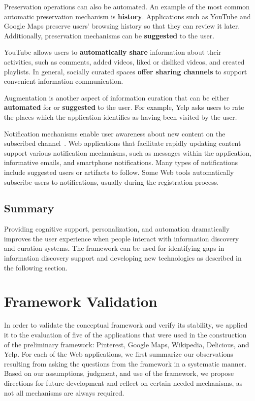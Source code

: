 \documentclass{sigchi}
\begin{document}
{{{{Preservation operations can also be automated. An example of the most common automatic preservation mechanism is \textbf{history}. Applications such as YouTube and Google Maps preserve users' browsing history so that they can review it later. Additionally, preservation mechanisms can be \textbf{suggested} to the user.


YouTube allows users to \textbf{automatically share} information about their activities, such as comments,  added videos, liked or disliked videos, and created playlists. In general, socially curated spaces \textbf{offer sharing channels} to support convenient information communication.
 
Augmentation is another aspect of information curation that can be either \textbf{automated} for or \textbf{suggested} to the user. For example, Yelp asks users to rate the places which the application identifies as having been visited by the user. 


Notification mechanisms enable user awareness about new content on the subscribed channel~\cite{millen2005social}. Web applications that facilitate rapidly updating content support various notification mechanisms, such as messages within the application, informative emails, and smartphone notifications. Many types of notifications include suggested users or artifacts to follow. Some Web tools automatically subscribe users to notifications, usually during the registration process.
} %
{\subsection{Summary}
Providing cognitive support, personalization, and automation dramatically improves the user experience when people interact with information discovery and curation systems. The framework can be used for identifying gaps in information discovery support and developing new technologies as described in the following section.  
}
}

\section{Framework Validation}
\label{section:validation}
In order to validate the conceptual framework and verify its stability, we applied it to the evaluation of five of the applications that were used in the construction of the preliminary framework: Pinterest, Google Maps, Wikipedia, Delicious, and Yelp. For each of the Web applications, we first summarize our observations resulting from asking the questions from the framework in a systematic manner. Based on our assumptions, judgment, and use of the framework, we propose directions for future development and reflect on certain needed mechanisms, as not all mechanisms are always required.  

}}
\end{document}
